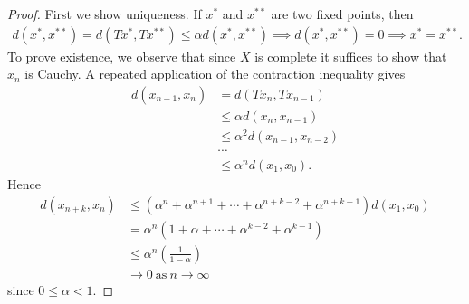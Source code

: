   \begin{proof} First we show uniqueness. If $x^*$ and $x^{**}$ are two fixed
	points, then
	\begin{equation*}
		\begin{split}
			d(x^*, x^{**}) = d(Tx^*, Tx^{**}) \le \alpha d(x^*, x^{**}) \implies d(x^*,
			x^{**}) = 0 \implies x^* = x^{**}.
		\end{split}
	\end{equation*}
To prove existence, we observe that since $X$ is complete it suffices to show
that $x_n$ is Cauchy. A repeated application of the
contraction inequality gives
%
%
\begin{equation*}
	\begin{split}
		d\left( x_{n+1},x_n \right)
		& = d\left( Tx_n, Tx_{n-1} \right)
		\\
		& \le \alpha d\left( x_n, x_{n-1} \right)
		\\
		& \le \alpha^2 d\left( x_{n-1}, x_{n-2} \right)
		\\
		& \cdots
		\\
		& \le \alpha^n d\left( x_1, x_0 \right).
	\end{split}
\end{equation*}
%
%
Hence
%
%
\begin{equation*}
\begin{split}
  d\left( x_{n+k},x_n \right)
  & \le (\alpha^{n } +\alpha^{n+1} + \cdots +
  \alpha^{n+k-2} + \alpha^{n+k-1})d(x_{1}, x_{0}) 
  \\
  & = \alpha^{n}(1 + \alpha + \cdots + \alpha^{k-2} + \alpha^{k-1})
  \\
  & \le \alpha^{n}\left( \frac{1}{1 - \alpha} \right)
  \\
  & \to 0 \ \text{as} \ n \to \infty
\end{split}
\end{equation*}
%
%
since $0 \le \alpha < 1$. 
\end{proof}
%
%
%
%
%
%
%

